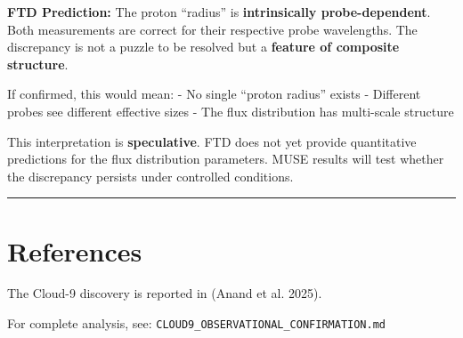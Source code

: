 \documentclass[
  11pt,
  letterpaper,
  twoside,
  openright]{book}
\begin{document}
\textbf{FTD Prediction:} The proton ``radius'' is \textbf{intrinsically
probe-dependent}. Both measurements are correct for their respective
probe wavelengths. The discrepancy is not a puzzle to be resolved but a
\textbf{feature of composite structure}.

If confirmed, this would mean: - No single ``proton radius'' exists -
Different probes see different effective sizes - The flux distribution
has multi-scale structure

\begin{tcolorbox}[enhanced jigsaw, coltitle=black, colbacktitle=quarto-callout-warning-color!10!white, toprule=.15mm, colframe=quarto-callout-warning-color-frame, arc=.35mm, opacityback=0, bottomtitle=1mm, toptitle=1mm, breakable, colback=white, titlerule=0mm, opacitybacktitle=0.6, title=\textcolor{quarto-callout-warning-color}{\faExclamationTriangle}\hspace{0.5em}{Epistemic Status}, rightrule=.15mm, bottomrule=.15mm, leftrule=.75mm, left=2mm]

This interpretation is \textbf{speculative}. FTD does not yet provide
quantitative predictions for the flux distribution parameters. MUSE
results will test whether the discrepancy persists under controlled
conditions.

\end{tcolorbox}

\begin{center}\rule{0.5\linewidth}{0.5pt}\end{center}

\section{References}\label{sec-obs-refs}

The Cloud-9 discovery is reported in (Anand et al. 2025).

For complete analysis, see:
\texttt{CLOUD9\_OBSERVATIONAL\_CONFIRMATION.md}
\end{document}
